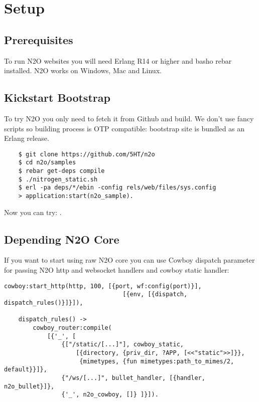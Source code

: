 \section{Setup}

\subsection{Prerequisites}
To run N2O websites you will need Erlang R14 or higher and basho rebar installed.
N2O works on Windows, Mac and Linux.

\subsection{Kickstart Bootstrap}
To try N2O you only need to fetch it from Github and build. We don't use
fancy scripts so building process is OTP compatible: bootstrap site
is bundled as an Erlang release.

\vspace{1\baselineskip}
\begin{lstlisting}
    $ git clone https://github.com/5HT/n2o
    $ cd n2o/samples
    $ rebar get-deps compile
    $ ./nitrogen_static.sh
    $ erl -pa deps/*/ebin -config rels/web/files/sys.config
    > application:start(n2o_sample).
\end{lstlisting}
\vspace{1\baselineskip}

Now you can try: .

\newpage
\subsection{Depending N2O Core}
If you want to start using raw N2O core you can use Cowboy dispatch parameter
for passing N2O http and websocket handlers and cowboy static handler:

\begin{lstlisting}[caption=web\_sup.erl]
    cowboy:start_http(http, 100, [{port, wf:config(port)}],
                                 [{env, [{dispatch, dispatch_rules()}]}]),

    dispatch_rules() ->
        cowboy_router:compile(
            [{'_', [
                {["/static/[...]"], cowboy_static,
                    [{directory, {priv_dir, ?APP, [<<"static">>]}},
                     {mimetypes, {fun mimetypes:path_to_mimes/2, default}}]}, 
                {"/ws/[...]", bullet_handler, [{handler, n2o_bullet}]},
                {'_', n2o_cowboy, []} ]}]).
\end{lstlisting}

